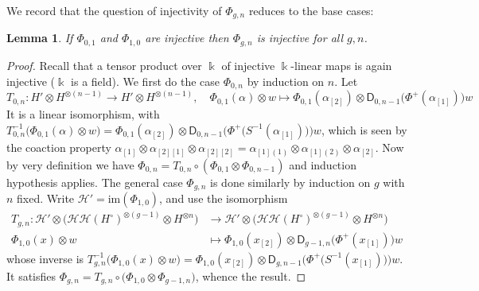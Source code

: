 \documentclass[11pt]{amsart}
\newtheorem{lem}[teo]{Lemma}
\begin{document}
\smallskip

We record that the question of injectivity of $\Phi_{g,n}$ reduces to the base cases:
\begin{lem}\label{lemmaInjAlekseev}
If $\Phi_{0,1}$ and $\Phi_{1,0}$ are injective then $\Phi_{g,n}$ is injective for all $g,n$.
\end{lem}
\begin{proof} Recall that a tensor product over $\Bbbk$ of injective $\Bbbk$-linear maps is again injective ($\Bbbk$ is a field). We first do the case $\Phi_{0,n}$ by induction on $n$. Let
\[ T_{0,n} : H' \otimes H^{\otimes (n-1)} \to H' \otimes H^{\otimes (n-1)}, \quad \Phi_{0,1}(\alpha) \otimes w \mapsto \Phi_{0,1}(\alpha_{[2]}) \otimes \mathsf{D}_{0,n-1}\bigl( \Phi^+(\alpha_{[1]}) \bigr)w \]
It is a linear isomorphism, with $T_{0,n}^{-1}\bigl( \Phi_{0,1}(\alpha) \otimes w \bigr) = \Phi_{0,1}(\alpha_{[2]}) \otimes \mathsf{D}_{0,n-1}\bigl( \Phi^+\bigl( S^{-1}(\alpha_{[1]}) \bigr) \bigr)w$, which is seen by the coaction property $\alpha_{[1]} \otimes \alpha_{[2][1]} \otimes \alpha_{[2][2]} = \alpha_{[1](1)} \otimes \alpha_{[1](2)} \otimes \alpha_{[2]}$. Now by very definition we have $\Phi_{0,n} = T_{0,n} \circ (\Phi_{0,1} \otimes \Phi_{0,n-1})$ and induction hypothesis applies. The general case $\Phi_{g,n}$ is done similarly by induction on $g$ with $n$ fixed. Write $\mathcal{H}' = \mathrm{im}(\Phi_{1,0})$, and use the isomorphism
\begin{align*}
T_{g,n} : \mathcal{H}' \otimes \bigl( \mathcal{HH}(H^\circ)^{\otimes (g-1)} \otimes H^{\otimes n} \bigr) &\to \mathcal{H}' \otimes \bigl( \mathcal{HH}(H^\circ)^{\otimes (g-1)} \otimes H^{\otimes n} \bigr)\\
\Phi_{1,0}(x) \otimes w &\mapsto \Phi_{1,0}(x_{[2]}) \otimes \mathsf{D}_{g-1,n}\bigl( \Phi^+(x_{[1]}) \bigr)w
\end{align*}
whose inverse is $T_{g,n}^{-1}\bigl( \Phi_{1,0}(x) \otimes w \bigr) = \Phi_{1,0}(x_{[2]}) \otimes \mathsf{D}_{g,n-1}\bigl( \Phi^+\bigl( S^{-1}(x_{[1]}) \bigr) \bigr)w$. It satisfies $\Phi_{g,n} = T_{g,n} \circ \bigl( \Phi_{1,0} \otimes \Phi_{g-1,n} \bigr)$, whence the result.
\end{proof}
\end{document}
